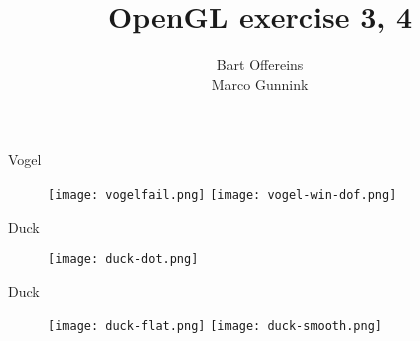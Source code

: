 \documentclass{beamer}
\author{Bart Offereins\\Marco Gunnink}
\title{OpenGL exercise 3, 4}
\begin{document}
\titlepage

\begin{frame}{Vogel}

   \begin{figure}[ht]
       \texttt{[image: vogelfail.png]} %
       \texttt{[image: vogel-win-dof.png]} %
    \end{figure}

\end{frame}

\begin{frame}{Duck}

   \begin{figure}[ht]
       \texttt{[image: duck-dot.png]} %
    \end{figure}

\end{frame}

\begin{frame}{Duck}

   \begin{figure}[ht]
        \texttt{[image: duck-flat.png]} %
        \texttt{[image: duck-smooth.png]} %
    \end{figure}

\end{frame}
\end{document}
